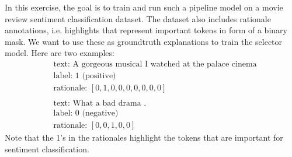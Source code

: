 \documentclass[a4paper]{article}
\begin{document}
In this exercise, the goal is to train and run such a pipeline model on a movie review sentiment classification dataset.
The dataset also includes rationale annotations, i.e. highlights that represent important tokens in form of a binary mask.
We want to use these as groundtruth explanations to train the selector model.
Here are two examples:
\begin{align*}
&\text{text: A gorgeous musical I watched at the palace cinema}\\
&\text{label: 1 (positive)}\\
&\text{rationale: }[0, 1, 0, 0, 0, 0, 0, 0, 0]\\
\\
&\text{text: What a bad drama .}\\
&\text{label: 0 (negative)}\\
&\text{rationale: }[0, 0, 1, 0, 0]
\end{align*}
Note that the 1's in the rationales highlight the tokens that are important for sentiment classification.
\end{document}
